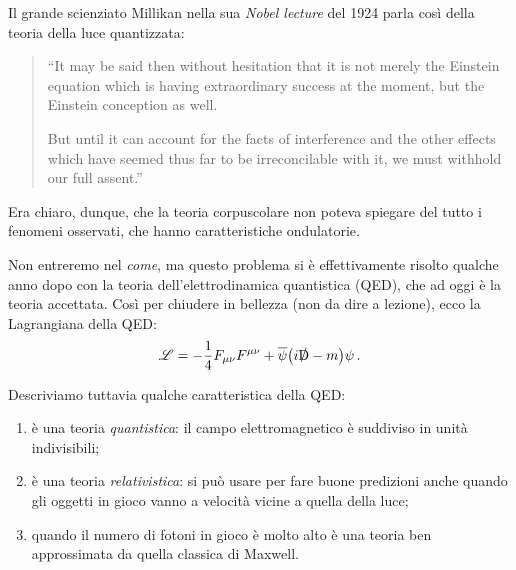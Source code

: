 \documentclass{article}
\begin{document}
Il grande scienziato Millikan nella sua \emph{Nobel lecture} del 1924
\autocite[]{millikanRobertMillikanNobel1924} parla così della teoria della luce quantizzata: 

\begin{quotation}
``It may be said then without hesitation that it
is not merely the Einstein equation which is having extraordinary success at
the moment, but the Einstein conception as well.

But until it can account for the facts of interference and the other effects
which have seemed thus far to be irreconcilable with it, we must withhold
our full assent.''
\end{quotation}

Era chiaro, dunque, che la teoria corpuscolare non poteva spiegare del tutto i fenomeni osservati, che hanno caratteristiche ondulatorie.

Non entreremo nel \emph{come}, ma questo problema si è effettivamente risolto qualche anno dopo con la teoria dell'elettrodinamica quantistica (QED), che ad oggi è la teoria accettata. 
Così per chiudere in bellezza (non da dire a lezione), ecco la Lagrangiana della QED:
%
\begin{align}
\mathscr{L} = - \frac{1}{4}  F_{\mu \nu } F^{\mu \nu }
+ \overline{\psi} \qty(i \slashed{\DD} -m ) \psi 
\,.
\end{align}

Descriviamo tuttavia qualche caratteristica della QED: 
\begin{enumerate}
    \item è una teoria \emph{quantistica}: il campo elettromagnetico è suddiviso in unità indivisibili;
    \item è una teoria \emph{relativistica}: si può usare per fare buone predizioni anche quando gli oggetti in gioco vanno a velocità vicine a quella della luce;
    \item quando il numero di fotoni in gioco è molto alto è una teoria ben approssimata da quella classica di Maxwell.
\end{enumerate}

\end{document}
